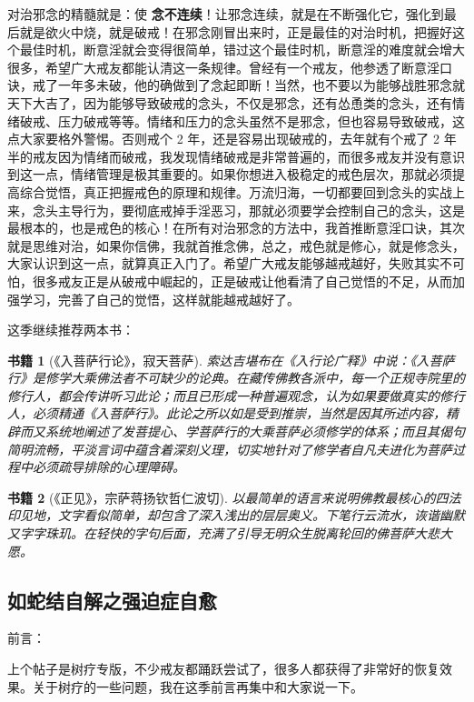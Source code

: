 \documentclass{ctexart}
\newtheorem{book}{书籍}
\begin{document}
对治邪念的精髓就是：使 \textbf{念不连续}！让邪念连续，就是在不断强化它，强化到最后就是欲火中烧，就是破戒！在邪念刚冒出来时，正是最佳的对治时机，把握好这个最佳时机，断意淫就会变得很简单，错过这个最佳时机，断意淫的难度就会增大很多，希望广大戒友都能认清这一条规律。曾经有一个戒友，他参透了断意淫口诀，戒了一年多未破，他的确做到了念起即断！当然，也不要以为能够战胜邪念就天下大吉了，因为能够导致破戒的念头，不仅是邪念，还有怂恿类的念头，还有情绪破戒、压力破戒等等。情绪和压力的念头虽然不是邪念，但也容易导致破戒，这点大家要格外警惕。否则戒个 2 年，还是容易出现破戒的，去年就有个戒了 2 年半的戒友因为情绪而破戒，我发现情绪破戒是非常普遍的，而很多戒友并没有意识到这一点，情绪管理是极其重要的。如果你想进入极稳定的戒色层次，那就必须提高综合觉悟，真正把握戒色的原理和规律。万流归海，一切都要回到念头的实战上来，念头主导行为，要彻底戒掉手淫恶习，那就必须要学会控制自己的念头，这是最根本的，也是戒色的核心！在所有对治邪念的方法中，我首推断意淫口诀，其次就是思维对治，如果你信佛，我就首推念佛，总之，戒色就是修心，就是修念头，大家认识到这一点，就算真正入门了。希望广大戒友能够越戒越好，失败其实不可怕，很多戒友正是从破戒中崛起的，正是破戒让他看清了自己觉悟的不足，从而加强学习，完善了自己的觉悟，这样就能越戒越好了。

这季继续推荐两本书：

\begin{book}[《入菩萨行论》，寂天菩萨]
    索达吉堪布在《入行论广释》中说：《入菩萨行》是修学大乘佛法者不可缺少的论典。在藏传佛教各派中，每一个正规寺院里的修行人，都会传讲听习此论；而且已形成一种普遍观念，认为如果要做真实的修行人，必须精通《入菩萨行》。此论之所以如是受到推崇，当然是因其所述内容，精辟而又系统地阐述了发菩提心、学菩萨行的大乘菩萨必须修学的体系；而且其偈句简明流畅，平淡言词中蕴含着深刻义理，切实地针对了修学者自凡夫进化为菩萨过程中必须疏导排除的心理障碍。
\end{book}

\begin{book}[《正见》，宗萨蒋扬钦哲仁波切]
    以最简单的语言来说明佛教最核心的四法印见地，文字看似简单，却包含了深入浅出的层层奥义。下笔行云流水，诙谐幽默又字字珠玑。在轻快的字句后面，充满了引导无明众生脱离轮回的佛菩萨大悲大愿。
\end{book}

\subsection{如蛇结自解之强迫症自愈}

前言：

上个帖子是树疗专版，不少戒友都踊跃尝试了，很多人都获得了非常好的恢复效果。关于树疗的一些问题，我在这季前言再集中和大家说一下。
\end{document}
